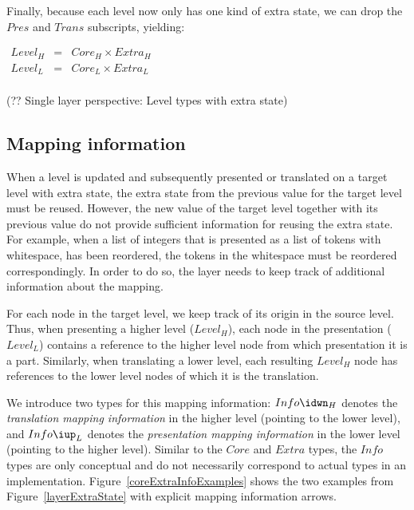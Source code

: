 Finally, because each level now only has one kind of extra state, we can drop the $Pres$ and $Trans$ subscripts, yielding:

\begin{small}\( \begin{array}{lcll}
Level_{H} & = & Core_{H} \times Extra_{H}\\
Level_{L} & = & Core_{L} \times Extra_{L}\\
\end{array}\)\end{small}
\begin{center}(?? Single layer perspective: Level types with extra state) \end{center}\vspace{1em}


%																
\subsection{Mapping information} \label{sect:mappingInformation}

When a level is updated and subsequently presented or translated on a target level with extra state, the extra state from the previous value for the target level must be reused. However, the new value of the target level together with its previous value do not provide sufficient information for reusing the extra state. For example, when a list of integers that is presented as a list of tokens with whitespace, has been reordered, the tokens in the whitespace must be reordered correspondingly.  In order to do so, the layer needs to keep track of additional information about the mapping.

For each node in the target level, we keep track of its origin in the source level. Thus, when presenting a higher level ($Level_{H}$), each node in the presentation ($Level_{L}$) contains a reference to the higher level node from which presentation it is a part.  Similarly, when translating a lower level, each resulting $Level_{H}$ node has references to the lower level nodes of which it is the translation. 

We introduce two types for this mapping information: $Info\idwn_{H}$ denotes the {\em translation mapping information} in the higher level (pointing to the lower level), and $Info\iup_{L}$ denotes the {\em presentation mapping information} in the lower level (pointing to the higher level). Similar to the $Core$ and $Extra$ types, the $Info$ types are only conceptual and do not necessarily correspond to actual types in an implementation. Figure~\ref{coreExtraInfoExamples} shows the two examples from Figure~\ref{layerExtraState} with explicit mapping information arrows. 

